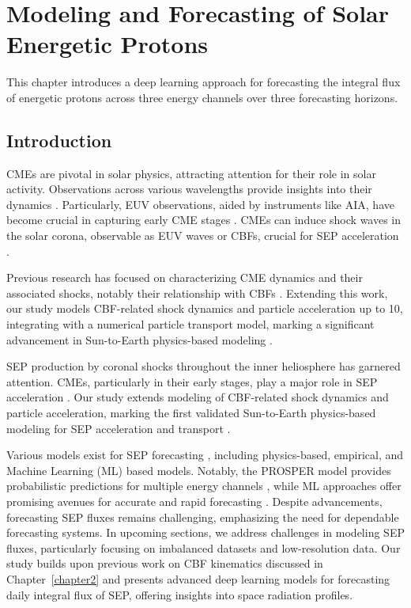 \chapter{Modeling and Forecasting of Solar Energetic Protons}
\label{chapter4}
This chapter introduces a deep learning approach for forecasting the integral flux of energetic protons across three energy channels over three forecasting horizons.

\section{Introduction}
\label{sec_ch4_intro}
CMEs are pivotal in solar physics, attracting attention for their role in solar activity. Observations across various wavelengths provide insights into their dynamics \citep{vourlidas_2003, zhang_2006, bein_2011, bastian_2001, veronig_2010}. Particularly, EUV observations, aided by instruments like AIA, have become crucial in capturing early CME stages \citep{lemen_2012, pesnell_2012}. CMEs can induce shock waves in the solar corona, observable as EUV waves or CBFs, crucial for SEP acceleration \citep{thompson_1998, long_2011, ontiveross_2009, gopalswamy_2011, battarbee_2013, kozarev_2013, schwadron_2014, kong_2017}.

Previous research has focused on characterizing CME dynamics and their associated shocks, notably their relationship with CBFs \citep{kozarev_2019}. Extending this work, our study models CBF-related shock dynamics and particle acceleration up to 10\rsun, integrating with a numerical particle transport model, marking a significant advancement in Sun-to-Earth physics-based modeling \citep{kozarev_2022}.

SEP production by coronal shocks throughout the inner heliosphere has garnered attention. CMEs, particularly in their early stages, play a major role in SEP acceleration \citep{reames_1999, ontiveross_2009, gopalswamy_2011, battarbee_2013, kozarev_2013, schwadron_2014, kong_2017}. Our study extends modeling of CBF-related shock dynamics and particle acceleration, marking the first validated Sun-to-Earth physics-based modeling for SEP acceleration and transport \citep{kozarev_2022}.

Various models exist for SEP forecasting \citep{whitman_2022}, including physics-based, empirical, and Machine Learning (ML) based models. Notably, the PROSPER model provides probabilistic predictions for multiple energy channels \citep{papaioannou_2022}, while ML approaches offer promising avenues for accurate and rapid forecasting \citep{lavasa_2021, kasapis_2022}. Despite advancements, forecasting SEP fluxes remains challenging, emphasizing the need for dependable forecasting systems.
In upcoming sections, we address challenges in modeling SEP fluxes, particularly focusing on imbalanced datasets and low-resolution data. Our study builds upon previous work on CBF kinematics discussed in Chapter~\ref{chapter2} and presents advanced deep learning models for forecasting daily integral flux of SEP, offering insights into space radiation profiles.

